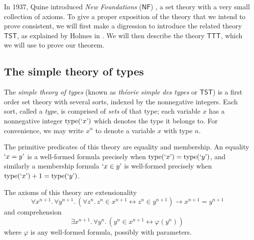 In 1937, Quine introduced \emph{New Foundations} (\( \mathsf{NF} \)) \cite{quine-nf}, a set theory with a very small collection of axioms.
To give a proper exposition of the theory that we intend to prove consistent, we will first make a digression to introduce the related theory \( \mathsf{TST} \), as explained by Holmes in \cite{con-nf}.
We will then describe the theory \( \mathsf{TTT} \), which we will use to prove our theorem.

\subsection{The simple theory of types}

The \emph{simple theory of types} (known as \emph{théorie simple des types} or \( \mathsf{TST} \)) is a first order set theory with several sorts, indexed by the nonnegative integers.
Each sort, called a \emph{type}, is comprised of \emph{sets} of that type; each variable \( x \) has a nonnegative integer \( \operatorname{type}(\text{`}x\text{'}) \) which denotes the type it belongs to.
For convenience, we may write \( x^n \) to denote a variable \( x \) with type \( n \).

The primitive predicates of this theory are equality and membership.
An equality \( \text{`}x = y\text{'} \) is a well-formed formula precisely when \( \operatorname{type}(\text{`}x\text{'}) = \operatorname{type}(\text{`}y\text{'}) \), and similarly a membership formula \( \text{`}x \in y\text{'} \) is well-formed precisely when \( \operatorname{type}(\text{`}x\text{'}) + 1 = \operatorname{type}(\text{`}y\text{'}) \).

The axioms of this theory are extensionality
\[ \forall x^{n + 1}.\, \forall y^{n + 1}.\, (\forall z^n.\, z^n \in x^{n+1} \leftrightarrow z^n \in y^{n+1}) \to x^{n+1} = y^{n+1} \]
and comprehension
\[ \exists x^{n + 1}.\, \forall y^n.\, (y^n \in x^{n+1} \leftrightarrow \varphi(y^n)) \]
where \( \varphi \) is any well-formed formula, possibly with parameters.

